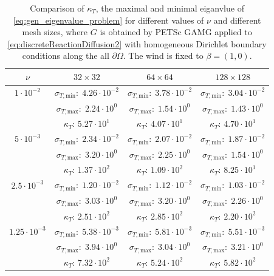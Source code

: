 \documentclass[hidelinks,onefignum,onetabnum]{siamart220329}
\begin{document}
\begin{table}
    \centering
    \caption{Comparison of $\kappa_T$, the maximal and minimal eiganvlue of \eqref{eq:gen_eigenvalue_problem} for different values of $\nu$ and different mesh sizes, where $G$ is obtained by PETSc GAMG applied to \eqref{eq:discreteReactionDiffusion2} with homogeneous Dirichlet boundary conditions along the all $\partial \Omega$.
        The wind is fixed to $\beta = (1,0)$.}
    \label{tab:spectral_reactionDiffusionAMG}
%
    \begin{tabular}{c|c|c|c}
        \toprule
        $\nu$               & $32\times 32$ & $64\times 64$ & $128\times 128$ \\
        \midrule
        $1\cdot 10^{-2}$    & $\sigma_{T,\text{min}}:\;4.26\cdot 10^{-2}$ & $\sigma_{T,\text{min}}:\;3.78\cdot 10^{-2}$ & $\sigma_{T,\text{min}}:\;3.04\cdot 10^{-2}$ \\
                            & $\sigma_{T,\text{max}}:\;2.24\cdot 10^{0}$ & $\sigma_{T,\text{max}}:\;1.54\cdot 10^{0}$ & $\sigma_{T,\text{max}}:\;1.43\cdot 10^{0}$ \\
                            & $\kappa_T:\,5.27\cdot 10^{1}$ & $\kappa_T:\,4.07\cdot 10^{1}$ & $\kappa_T:\,4.70\cdot 10^{1}$ \\
        \midrule
        $5\cdot 10^{-3}$    & $\sigma_{T,\text{min}}:\;2.34\cdot 10^{-2}$ & $\sigma_{T,\text{min}}:\;2.07\cdot 10^{-2}$ & $\sigma_{T,\text{min}}:\;1.87\cdot 10^{-2}$ \\
                            & $\sigma_{T,\text{max}}:\;3.20\cdot 10^{0}$ & $\sigma_{T,\text{max}}:\;2.25\cdot 10^{0}$ & $\sigma_{T,\text{max}}:\;1.54\cdot 10^{0}$ \\
                            & $\kappa_T:\,1.37\cdot 10^{2}$ & $\kappa_T:\,1.09\cdot 10^{2}$ & $\kappa_T:\,8.25\cdot 10^{1}$ \\
        \midrule
        $2.5\cdot 10^{-3}$  & $\sigma_{T,\text{min}}:\;1.20\cdot 10^{-2}$ & $\sigma_{T,\text{min}}:\;1.12\cdot 10^{-2}$ & $\sigma_{T,\text{min}}:\;1.03\cdot 10^{-2}$ \\
                            & $\sigma_{T,\text{max}}:\;3.03\cdot 10^{0}$ & $\sigma_{T,\text{max}}:\;3.20\cdot 10^{0}$ & $\sigma_{T,\text{max}}:\;2.26\cdot 10^{0}$ \\
                            & $\kappa_T:\,2.51\cdot 10^{2}$ & $\kappa_T:\,2.85\cdot 10^{2}$ & $\kappa_T:\,2.20\cdot 10^{2}$ \\
        \midrule
        $1.25\cdot 10^{-3}$ & $\sigma_{T,\text{min}}:\;5.38\cdot 10^{-3}$ & $\sigma_{T,\text{min}}:\;5.81\cdot 10^{-3}$ & $\sigma_{T,\text{min}}:\;5.51\cdot 10^{-3}$ \\
                            & $\sigma_{T,\text{max}}:\;3.94\cdot 10^{0}$ & $\sigma_{T,\text{max}}:\;3.04\cdot 10^{0}$ & $\sigma_{T,\text{max}}:\;3.21\cdot 10^{0}$ \\
                            & $\kappa_T:\,7.32\cdot 10^{2}$ & $\kappa_T:\,5.24\cdot 10^{2}$ & $\kappa_T:\,5.82\cdot 10^{2}$ \\
        \bottomrule
    \end{tabular}
    \vspace{1cm}
\end{table}
\end{document}
